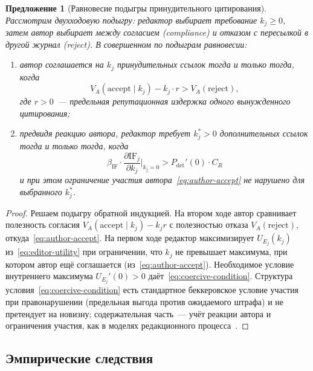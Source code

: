 \documentclass[12pt,a4paper]{article}
\newtheorem{proposition}{Предложение}
\theoremstyle{definition}
\begin{document}
\begin{proposition}[Равновесие подыгры принудительного цитирования]
  \label{prop:coercive}
  Рассмотрим двухходовую подыгру: редактор выбирает требование $k_j
  \geq 0$, затем автор выбирает между согласием (compliance) и
  отказом с пересылкой в другой журнал (reject). В совершенном по
  подыграм равновесии:
  \begin{enumerate}
    \item автор соглашается на $k_j$ принудительных ссылок тогда и
      только тогда, когда
      \begin{equation}
        V_A(\mathrm{accept}\mid k_j) - k_j \cdot r > V_A(\mathrm{reject}),
        \label{eq:author-accept}
      \end{equation}
      где $r > 0$~--- предельная репутационная издержка одного
      вынужденного цитирования;
    \item предвидя реакцию автора, редактор требует $k_j^* > 0$
      дополнительных ссылок тогда и только тогда, когда
      \begin{equation}
        \beta_{\mathrm{IF}} \cdot \frac{\partial
        \mathrm{IF}_j}{\partial k_j}\biggr|_{k_j=0} >
        P_{\mathrm{det}}'(0) \cdot C_R
        \label{eq:coercive-condition}
      \end{equation}
      и при этом ограничение участия автора~\eqref{eq:author-accept}
      не нарушено для выбранного $k_j^*$.
  \end{enumerate}
\end{proposition}

\begin{proof}
  Решаем подыгру обратной индукцией. На втором ходе автор сравнивает
  полезность согласия $V_A(\mathrm{accept}\mid k_j) - k_j r$ с
  полезностью отказа $V_A(\mathrm{reject})$,
  откуда~\eqref{eq:author-accept}. На первом ходе редактор
  максимизирует $U_{E_j}(k_j)$ из~\eqref{eq:editor-utility} при
  ограничении, что $k_j$ не превышает максимума, при котором автор
  ещё соглашается (из~\eqref{eq:author-accept}). Необходимое условие
  внутреннего максимума $U_{E_j}'(0) > 0$
  даёт~\eqref{eq:coercive-condition}. Структура
  условия~\eqref{eq:coercive-condition} есть стандартное беккеровское
  условие участия при правонарушении (предельная выгода против
  ожидаемого штрафа) и не претендует на новизну; содержательная
  часть~--- учёт реакции автора и ограничения участия, как в моделях
  редакционного процесса~\citep{garcia2015authored}.
\end{proof}

\subsection{Эмпирические следствия}
\end{document}
